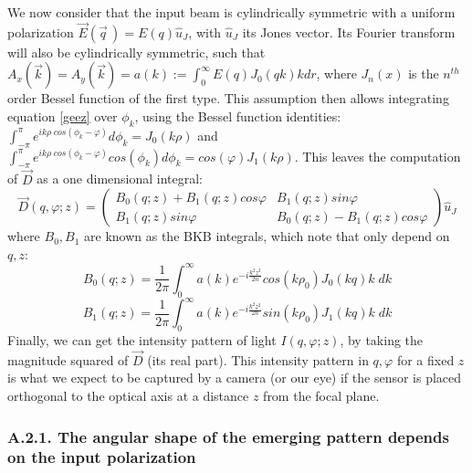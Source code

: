 \documentclass[11pt, a4paper, twoside]{article} %
\begin{document}
We now consider that the input beam is cylindrically symmetric with a uniform polarization $\vec{E}(\vec{q}\,)=E(q)\hat{u}_J$, with $\hat{u}_J$ its Jones vector. Its Fourier transform will also be cylindrically symmetric, such that $A_x(\vec{k})=A_y(\vec{k})=a(k):=\int_0^\infty E(q)J_0(qk)k dr$, where $J_n(x)$ is the $n^{th}$ order Bessel function of the first type. This assumption then allows integrating equation \eqref{geez}
over $\phi_k$, using the Bessel function identities: $\int_{-\pi}^{\pi}e^{ik\rho\;cos(\phi_k-\varphi)}d\phi_k=J_0(k\rho)$ and $\int_{-\pi}^{\pi}e^{ik\rho\;cos(\phi_k-\varphi)}cos(\phi_k)d\phi_k=cos(\varphi)J_1(k\rho)$. This leaves the computation of $\vec{D}$ as a one dimensional integral:
\begin{equation}\label{master}
\vec{D}(q, \varphi;z)=\begin{pmatrix}
B_0(q;z)+B_1(q;z)cos\varphi & B_1(q;z) sin\varphi\\
B_1(q;z)sin\varphi & B_0(q;z)-B_1(q;z)cos\varphi
\end{pmatrix}\hat{u}_J
\end{equation}
where $B_0,B_1$ are known as the BKB integrals, which note that only depend on $q,z$:
\begin{equation}\label{bkb1}
B_0(q;z)=\frac{1}{2\pi}\int_0^\infty a(k)e^{-i\frac{k^2z^2}{2n}}cos(k\rho_0)J_0(kq)k\;dk
\end{equation}
\begin{equation}\label{bkb2}
B_1(q;z)=\frac{1}{2\pi}\int_0^\infty a(k)e^{-i\frac{k^2z^2}{2n}}sin(k\rho_0)J_1(kq)k\;dk
\end{equation}
Finally, we can get the intensity pattern of light $I(q,\varphi;z)$, by taking the magnitude squared of $\vec{D}$ (its real part). This intensity pattern in $q,\varphi$ for a fixed $z$ is what we expect to be captured by a camera (or our eye) if the sensor is placed orthogonal to the optical axis at a distance $z$ from the focal plane.

\subsubsection*{A.2.1. The angular shape of the emerging pattern depends on the input polarization}
\end{document}

